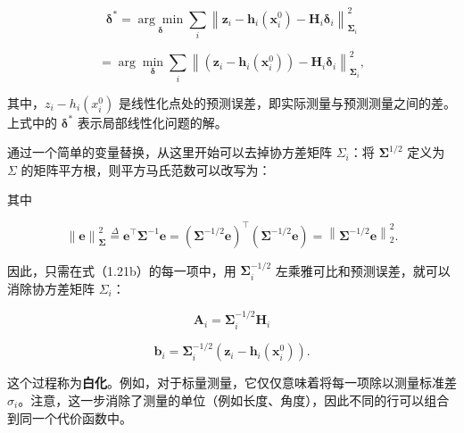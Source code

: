 \begin{equation}
\boldsymbol {\delta} ^ {*} = \underset {\boldsymbol {\delta}} {\arg \min} \sum_ {i} \left\| \boldsymbol {z} _ {i} - \boldsymbol {h} _ {i} (\boldsymbol {x} _ {i} ^ {0}) - \boldsymbol {H} _ {i} \boldsymbol {\delta} _ {i} \right\| _ {\boldsymbol {\Sigma} _ {i}} ^ {2}\tag{1.21a}
\end{equation}

\begin{equation}
= \arg \min _ {\boldsymbol {\delta}} \sum_ {i} \left\| \left(\boldsymbol {z} _ {i} - \boldsymbol {h} _ {i} (\boldsymbol {x} _ {i} ^ {0})\right) - \boldsymbol {H} _ {i} \boldsymbol {\delta} _ {i} \right\| _ {\boldsymbol {\Sigma} _ {i}} ^ {2},\tag{1.21b}
\end{equation}

其中，$z_i-h_i(x_i^0)$ 是线性化点处的预测误差，即实际测量与预测测量之间的差。上式中的 $\pmb\delta^*$ 表示局部线性化问题的解。

通过一个简单的变量替换，从这里开始可以去掉协方差矩阵 $\Sigma_i$：将 $\pmb\Sigma^{1/2}$ 定义为 $\Sigma$ 的矩阵平方根，则平方马氏范数可以改写为：

其中

\begin{equation}
\left\| \boldsymbol {e} \right\| _ {\boldsymbol {\Sigma}} ^ {2} \stackrel {{\Delta}} {{=}} \boldsymbol {e} ^ {\top} \boldsymbol {\Sigma} ^ {- 1} \boldsymbol {e} = \left(\boldsymbol {\Sigma} ^ {- 1 / 2} \boldsymbol {e}\right) ^ {\top} \left(\boldsymbol {\Sigma} ^ {- 1 / 2} \boldsymbol {e}\right) = \left\| \boldsymbol {\Sigma} ^ {- 1 / 2} \boldsymbol {e} \right\| _ {2} ^ {2}.\tag{1.22}
\end{equation}

因此，只需在式（1.21b）的每一项中，用 $\pmb\Sigma_i^{-1/2}$ 左乘雅可比和预测误差，就可以消除协方差矩阵 $\Sigma_i$：

\begin{equation}
\pmb {A} _ {i} = \pmb {\Sigma} _ {i} ^ {- 1 / 2} \pmb {H} _ {i}\tag{1.23a}
\end{equation}

\begin{equation}
\pmb {b} _ {i} = \pmb {\Sigma} _ {i} ^ {- 1 / 2} \left(\pmb {z} _ {i} - \pmb {h} _ {i} (\pmb {x} _ {i} ^ {0})\right).\tag{1.23b}
\end{equation}

这个过程称为\textbf{白化}。例如，对于标量测量，它仅仅意味着将每一项除以测量标准差 $\sigma_i$。注意，这一步消除了测量的单位（例如长度、角度），因此不同的行可以组合到同一个代价函数中。


